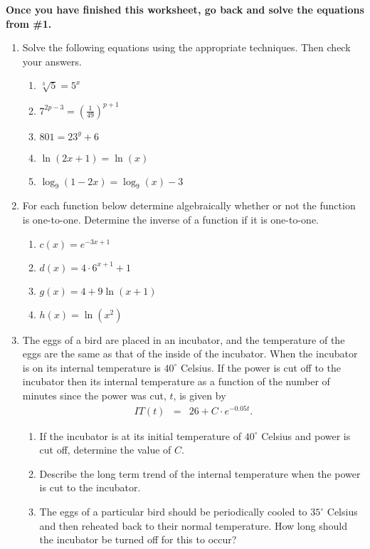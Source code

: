 \noindent \textbf{Once you have finished this worksheet, go back and
  solve the equations from \#1.}



\begin{enumerate}
\item Solve the following equations using the appropriate techniques.
  Then check your answers.
  \begin{enumerate}
  \item $\sqrt[3]{5}=5^x$
  \item $\displaystyle 7^{2p-3}=\left(\frac{1}{49}\right)^{p+1}$
  \item $801=23^y+6$
  \item $\ln(2x+1) = \ln(x)$
  \item $\log_9(1-2x) = \log_9(x) - 3$
  \end{enumerate}
\item For each function below determine algebraically whether or not
  the function is one-to-one. Determine the inverse of a function if
  it is one-to-one.
  \begin{enumerate}
  \item ${\displaystyle c(x) = e^{-3x+1}}$
  \item ${\displaystyle d(x) = 4\cdot 6^{x+1} + 1}$
  \item ${\displaystyle g(x) = 4 + 9\ln\left(x+1\right)}$
  \item ${\displaystyle h(x) = \ln\left(x^2\right)}$
  \end{enumerate}
    
\item The eggs of a bird are placed in an incubator, and the
  temperature of the eggs are the same as that of the inside of the
  incubator. When the incubator is on its internal temperature is
  $40^\circ$ Celsius. If the power is cut off to the incubator then
  its internal temperature as a function of the number of minutes
  since the power was cut, $t$, is given by
  \begin{eqnarray*}
    IT(t) & = & 26+C\cdot e^{-0.05t}.
  \end{eqnarray*}

  \begin{enumerate}
  \item If the incubator is at its initial temperature of $40^\circ$
    Celsius and power is cut off, determine the value of $C$.
  \item Describe the long term trend of the internal temperature when
    the power is cut to the incubator.
  \item The eggs of a particular bird should be periodically cooled to
    $35^\circ$ Celsius and then reheated back to their normal
    temperature. How long should the incubator be turned off for this
    to occur?
  \end{enumerate}


\end{enumerate}
